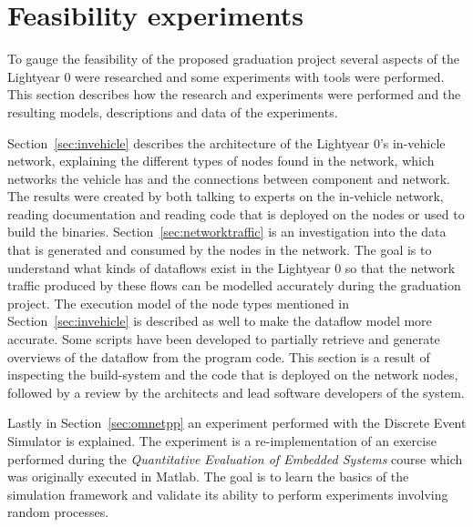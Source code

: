 \section{Feasibility experiments}
\label{sec:feasibility}
To gauge the feasibility of the proposed graduation project several aspects of the Lightyear 0 were researched and some experiments with tools were performed. This section describes how the research and experiments were performed and the resulting models, descriptions and data of the experiments.

Section~\ref{sec:invehicle} describes the architecture of the Lightyear 0's in-vehicle network, explaining the different types of nodes found in the network, which networks the vehicle has and the connections between component and network. The results were created by both talking to experts on the in-vehicle network, reading documentation and reading code that is deployed on the nodes or used to build the binaries. 
Section~\ref{sec:networktraffic} is an investigation into the data that is generated and consumed by the nodes in the network. The goal is to understand what kinds of dataflows exist in the Lightyear 0 so that the network traffic produced by these flows can be modelled accurately during the graduation project. The execution model of the node types mentioned in Section~\ref{sec:invehicle} is described as well to make the dataflow model more accurate. Some scripts have been developed to partially retrieve and generate overviews of the dataflow from the program code. This section is a result of inspecting the build-system and the code that is deployed on the network nodes, followed by a review by the architects and lead software developers of the system.

Lastly in Section~\ref{sec:omnetpp} an experiment performed with the Discrete Event Simulator \omnet is explained. The experiment is a re-implementation of an exercise performed during the \textit{Quantitative Evaluation of Embedded Systems} course which was originally executed in Matlab. The goal is to learn the basics of the simulation framework and validate its ability to perform experiments involving random processes.


\clearpage



\newpage